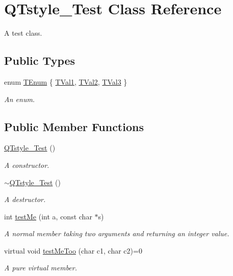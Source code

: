 \hypertarget{class_q_tstyle___test}{}\section{Q\+Tstyle\+\_\+\+Test Class Reference}
\label{class_q_tstyle___test}


A test class.  


\subsection*{Public Types}
\begin{DoxyCompactItemize}
\item 
enum \mbox{\hyperlink{class_q_tstyle___test_a0525f798cda415a94fedeceb806d2c49}{T\+Enum}} \{ \mbox{\hyperlink{class_q_tstyle___test_a0525f798cda415a94fedeceb806d2c49a7929af91f99c319ffe2e49c9632bc3fa}{T\+Val1}}, 
\mbox{\hyperlink{class_q_tstyle___test_a0525f798cda415a94fedeceb806d2c49afff89db6859123549579806212d9fd80}{T\+Val2}}, 
\mbox{\hyperlink{class_q_tstyle___test_a0525f798cda415a94fedeceb806d2c49a8227cd0f0c1285d59ff14376fcd00f85}{T\+Val3}}
 \}
\begin{DoxyCompactList}\small\item\em An enum. \end{DoxyCompactList}\end{DoxyCompactItemize}
\subsection*{Public Member Functions}
\begin{DoxyCompactItemize}
\item 
\mbox{\hyperlink{class_q_tstyle___test_a14a296ea4e2ad446712f2310bec60766}{Q\+Tstyle\+\_\+\+Test}} ()
\begin{DoxyCompactList}\small\item\em A constructor. \end{DoxyCompactList}\item 
\mbox{\hyperlink{class_q_tstyle___test_a7e82397d534d9a867f0857da01a46e9e}{$\sim$\+Q\+Tstyle\+\_\+\+Test}} ()
\begin{DoxyCompactList}\small\item\em A destructor. \end{DoxyCompactList}\item 
int \mbox{\hyperlink{class_q_tstyle___test_a8840748753118dd468e8368a28e49c62}{test\+Me}} (int a, const char $\ast$s)
\begin{DoxyCompactList}\small\item\em A normal member taking two arguments and returning an integer value. \end{DoxyCompactList}\item 
virtual void \mbox{\hyperlink{class_q_tstyle___test_ad5b201f097a720d44bf976c2f27efbda}{test\+Me\+Too}} (char c1, char c2)=0
\begin{DoxyCompactList}\small\item\em A pure virtual member. \end{DoxyCompactList}\end{DoxyCompactItemize}
